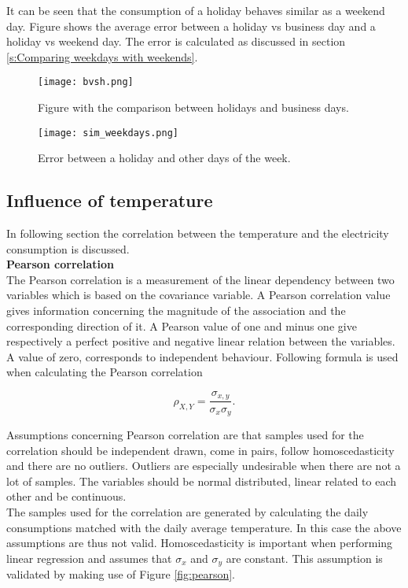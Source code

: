 It can be seen that the consumption of a holiday behaves similar as a weekend day. Figure shows the average error between a holiday vs business day and a holiday vs weekend day. The error is calculated as discussed in section \ref{s:Comparing weekdays with weekends}. 

\begin{figure}[h!]
	\centering
	\texttt{[image: bvsh.png]}
	\caption{Figure with the comparison between holidays and business days.}
	\label{fig:bvsh}
\end{figure}

\begin{figure}[h!]
	\centering
	\texttt{[image: sim\_weekdays.png]}
	\caption{Error between a holiday and other days of the week.}
	\label{fig:sim_weekdays}
\end{figure}


\subsection{Influence of temperature}
In following section the correlation between the temperature and the electricity consumption is discussed.\\


\textbf{Pearson correlation}\\
The Pearson correlation is a measurement of the linear dependency between two variables which is based on the covariance variable. A Pearson correlation value gives information concerning the magnitude of the association and the corresponding direction of it. A Pearson value of one and minus one give respectively a perfect positive and negative linear relation between the variables. A value of zero, corresponds to independent behaviour. Following formula is used when calculating the Pearson correlation

\begin{equation}\label{eq:pearson}
	\rho_{X,Y} = \frac{\sigma_{x,y}}{\sigma_x\sigma_y}.
\end{equation}

Assumptions concerning Pearson correlation are that samples used for the correlation should be independent drawn, come in pairs, follow homoscedasticity and there are no outliers. Outliers are especially undesirable when there are not a lot of samples. The variables should be normal distributed, linear related to each other and be continuous.\\
The samples used for the correlation are generated by calculating the daily consumptions matched with the daily average temperature. In this case the above assumptions are thus not valid. Homoscedasticity is important when performing linear regression and assumes that $ \sigma_x $ and $ \sigma_y $ are constant. This assumption is validated by making use of Figure \ref{fig:pearson}.

